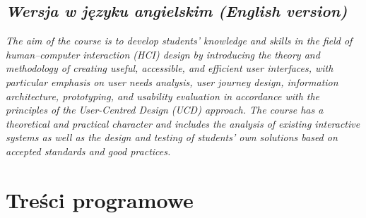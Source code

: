 \documentclass[12pt, a4paper]{article}
\begin{document}
\subsection*{\textit{Wersja w języku angielskim (English version)}}

\textit{The aim of the course is to develop students’ knowledge and skills in the field of human–computer interaction (HCI) design by introducing the theory and methodology of creating useful, accessible, and efficient user interfaces, with particular emphasis on user needs analysis, user journey design, information architecture, prototyping, and usability evaluation in accordance with the principles of the User-Centred Design (UCD) approach. The course has a theoretical and practical character and includes the analysis of existing interactive systems as well as the design and testing of students’ own solutions based on accepted standards and good practices.}


\section{Treści programowe}
\end{document}
